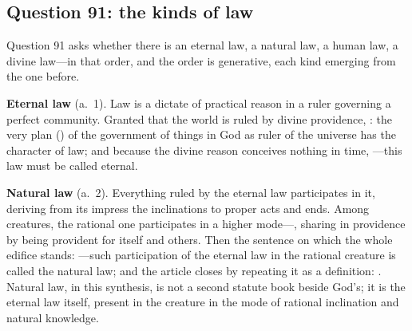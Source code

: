 \subsection{Question 91: the kinds of law}

Question 91 asks whether there is an eternal law, a natural law, a human law, a divine law---in that order, and the order is generative, each kind emerging from the one before.

\textbf{Eternal law} (a.~1). Law is a dictate of practical reason in a ruler governing a perfect community. Granted that the world is ruled by divine providence, : the very plan () of the government of things in God as ruler of the universe has the character of law; and because the divine reason conceives nothing in time, ---this law must be called eternal.

\textbf{Natural law} (a.~2). Everything ruled by the eternal law participates in it, deriving from its impress the inclinations to proper acts and ends. Among creatures, the rational one participates in a higher mode---, sharing in providence by being provident for itself and others. Then the sentence on which the whole edifice stands: ---such participation of the eternal law in the rational creature is called the natural law; and the article closes by repeating it as a definition: . Natural law, in this synthesis, is not a second statute book beside God's; it is the eternal law itself, present in the creature in the mode of rational inclination and natural knowledge.

